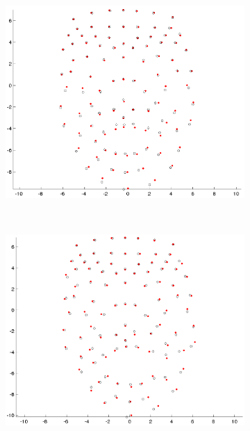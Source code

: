 \documentclass[11pt]{report}
\begin{document}
\begin{figure}[htbp!]
\begin{subfigure}[b]{0.3\textwidth}
        \end{subfigure}
        ~ %
        \begin{subfigure}[b]{0.3\textwidth}
                \includegraphics[width=\textwidth]{img/weights/3D/w2/w2_frame600_blends68.png} 
        \end{subfigure} \\
                \begin{subfigure}[b]{0.3\textwidth}
                \includegraphics[width=\textwidth]{img/weights/3D/w3/w3_200.png}

\end{subfigure}
\end{figure}
\end{document}
